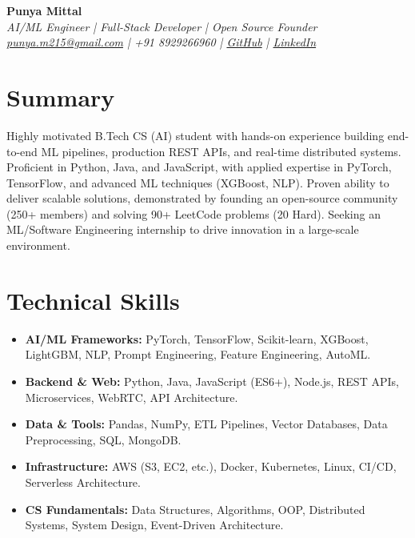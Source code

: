 \documentclass[10pt, letterpaper]{article}
\begin{document}
\pagestyle{empty}
\begin{center}
    \Huge \textbf{Punya Mittal} \\
    \em AI/ML Engineer | Full-Stack Developer | Open Source Founder
    \vspace{3pt}
    \small
    \href{mailto:punya.m215@gmail.com}{punya.m215@gmail.com} | +91 8929266960 | 
    \href{https://github.com/yourusername}{GitHub} | \href{https://linkedin.com/in/yourprofile}{LinkedIn}
\end{center}

\section*{Summary}
Highly motivated B.Tech CS (AI) student with hands-on experience building end-to-end ML pipelines, production REST APIs, and real-time distributed systems. Proficient in Python, Java, and JavaScript, with applied expertise in PyTorch, TensorFlow, and advanced ML techniques (XGBoost, NLP). Proven ability to deliver scalable solutions, demonstrated by founding an open-source community (250+ members) and solving 90+ LeetCode problems (20 Hard). Seeking an ML/Software Engineering internship to drive innovation in a large-scale environment.

\section*{Technical Skills}
\begin{itemize}[leftmargin=*, itemsep=2pt, parsep=0pt]
    \item \textbf{AI/ML Frameworks:} PyTorch, TensorFlow, Scikit-learn, XGBoost, LightGBM, NLP, Prompt Engineering, Feature Engineering, AutoML.
    \item \textbf{Backend & Web:} Python, Java, JavaScript (ES6+), Node.js, REST APIs, Microservices, WebRTC, API Architecture.
    \item \textbf{Data & Tools:} Pandas, NumPy, ETL Pipelines, Vector Databases, Data Preprocessing, SQL, MongoDB.
    \item \textbf{Infrastructure:} AWS (S3, EC2, etc.), Docker, Kubernetes, Linux, CI/CD, Serverless Architecture.
    \item \textbf{CS Fundamentals:} Data Structures, Algorithms, OOP, Distributed Systems, System Design, Event-Driven Architecture.
\end{itemize}
\end{document}

